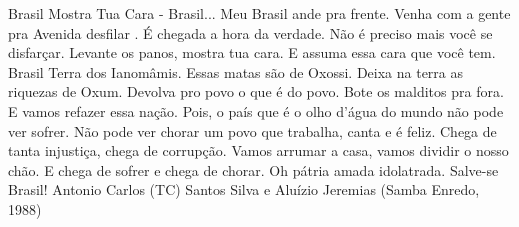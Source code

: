 
\begin{epigrafe}%
Brasil Mostra Tua Cara - Brasil... Meu Brasil ande pra frente. Venha com a gente pra Avenida desfilar . É chegada a hora da verdade. Não é preciso mais você se disfarçar. Levante os panos, mostra tua cara. E assuma essa cara que você tem. Brasil Terra dos Ianomâmis. Essas matas são de Oxossi. Deixa na terra as riquezas de Oxum. Devolva pro povo o que é do povo. Bote os malditos pra fora. E vamos refazer essa nação. Pois, o país que  é o olho d’água do mundo não pode ver sofrer. Não pode ver chorar um povo que trabalha, canta e é feliz. Chega de tanta injustiça, chega de corrupção. Vamos arrumar a casa, vamos dividir o nosso chão. E chega de sofrer e chega de chorar. Oh pátria amada idolatrada. Salve-se Brasil! Antonio Carlos (TC) Santos Silva e Aluízio Jeremias (Samba Enredo, 1988)
\end{epigrafe}
